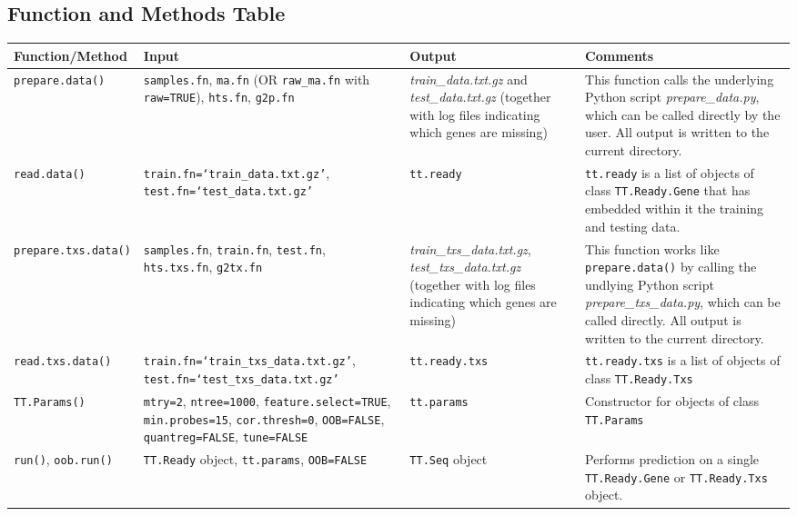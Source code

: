 \documentclass[a4paper,12pt]{article}
\begin{document}
\pagebreak
\begin{landscape}
\section{Function and Methods Table}
\label{functions}

\begin{table}[H]
\scriptsize
\centering
\begin{tabular}{|p{2.5cm}|p{6cm}|p{4cm}|p{5cm}|}
\hline
\textbf{Function/Method} & \textbf{Input} & \textbf{Output} & \textbf{Comments} \\
\hline
\texttt{prepare.data()} & \texttt{samples.fn}, \texttt{ma.fn} (OR \texttt{raw\_ma.fn} with \texttt{raw=TRUE}), \texttt{hts.fn}, \texttt{g2p.fn} & \textit{train\_data.txt.gz} and \textit{test\_data.txt.gz}  (together with log files indicating which genes are missing) & This function calls the underlying \textsf{Python} script \textit{prepare\_data.py}, which can be called directly by the user. All output is written to the current directory. \\
\hline
\texttt{read.data()} & \texttt{train.fn=`train\_data.txt.gz'}, \texttt{test.fn=`test\_data.txt.gz'} & \texttt{tt.ready} & \texttt{tt.ready} is a list of objects of class \texttt{TT.Ready.Gene} that has embedded within it the training and testing data. \\
\hline
\texttt{prepare.txs.data()} & \texttt{samples.fn}, \texttt{train.fn}, \texttt{test.fn}, \texttt{hts.txs.fn}, \texttt{g2tx.fn} & \textit{train\_txs\_data.txt.gz}, \textit{test\_txs\_data.txt.gz} (together with log files indicating which genes are missing) & 
This function works like \texttt{prepare.data()} by calling the undlying \textsf{Python} script \textit{prepare\_txs\_data.py}, which can be called directly. All output is written to the current directory. \\
\hline
\texttt{read.txs.data()} & \texttt{train.fn=`train\_txs\_data.txt.gz'}, \texttt{test.fn=`test\_txs\_data.txt.gz'} & \texttt{tt.ready.txs} & \texttt{tt.ready.txs} is a list of objects of class \texttt{TT.Ready.Txs} \\
\hline
\texttt{TT.Params()} & \texttt{mtry=2}, \texttt{ntree=1000}, \texttt{feature.select=TRUE}, \texttt{min.probes=15}, \texttt{cor.thresh=0}, \texttt{OOB=FALSE}, \texttt{quantreg=FALSE}, \texttt{tune=FALSE} & \texttt{tt.params} & Constructor for objects of class \texttt{TT.Params} \\
\hline
\texttt{run()}, \texttt{oob.run()} & \texttt{TT.Ready} object, \texttt{tt.params}, \texttt{OOB=FALSE} & \texttt{TT.Seq} object & Performs prediction on a single \texttt{TT.Ready.Gene} or \texttt{TT.Ready.Txs} object. \\

\end{tabular}
\end{table}
\end{landscape}
\end{document}
